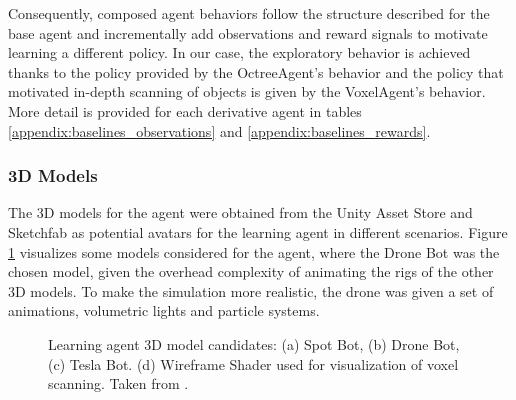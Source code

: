Consequently, composed agent behaviors follow the structure described for the base agent and incrementally add observations  and reward signals to motivate learning a different policy. In our case, the exploratory behavior is achieved thanks to the policy provided by the OctreeAgent's behavior and the policy that motivated in-depth scanning of objects is given by the VoxelAgent's behavior. More detail is provided for each derivative agent in tables \ref{appendix:baselines_observations} and \ref{appendix:baselines_rewards}.


\subsubsection{3D Models}
The 3D models for the agent were obtained from the Unity Asset Store \cite{unity-asset-store} and Sketchfab \cite{sketchfab2021} as potential avatars for the learning agent in different scenarios. Figure \ref{fig:unity-drone} visualizes some models considered for the agent, where the Drone Bot was the chosen model, given the overhead complexity of animating the rigs of the other 3D models. To make the simulation more realistic, the drone was given a set of animations, volumetric lights and particle systems.

\begin{figure}[!ht]
    \centering
    \caption{Learning agent 3D model candidates: (a) Spot Bot, (b) Drone Bot, (c) Tesla Bot. (d) Wireframe Shader used for visualization of voxel scanning. Taken from \cite{unity-asset-store, sketchfab2021}.}
    \label{fig:unity-drone}
\end{figure}

